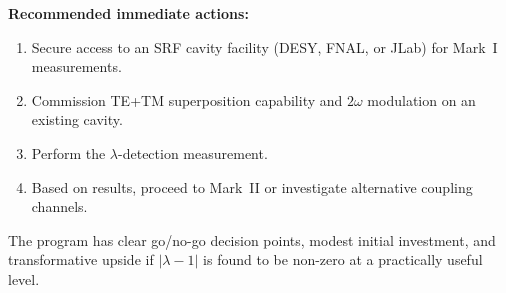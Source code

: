 \documentclass[11pt,a4paper]{article}
\begin{document}
\textbf{Recommended immediate actions:}
\begin{enumerate}
\item Secure access to an SRF cavity facility (DESY, FNAL, or JLab)
for Mark~I measurements.
\item Commission TE+TM superposition capability and $2\omega$ modulation
on an existing cavity.
\item Perform the $\lambda$-detection measurement.
\item Based on results, proceed to Mark~II or investigate alternative
coupling channels.
\end{enumerate}

The program has clear go/no-go decision points, modest initial investment,
and transformative upside if $|\lambda-1|$ is found to be non-zero at a
practically useful level.
\end{document}
